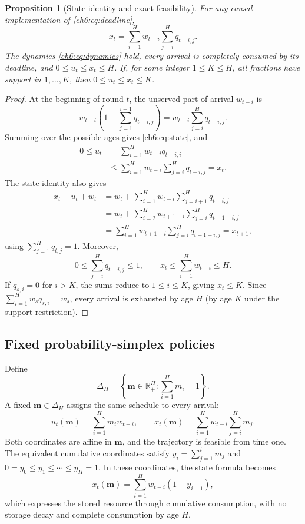 \documentclass[11pt]{article}
\newcommand{\Real}{\mathbb{R}}
\theoremstyle{plain}
\newtheorem{Thm:Proposition}[Thm:Theorem]{Proposition}
\theoremstyle{remark}
\numberwithin{equation}{section}
\begin{document}
\begin{Thm:Proposition}[State identity and exact feasibility]\label{ch6:prop:state}
For any causal implementation of \eqref{ch6:eq:deadline},
\begin{equation}\label{ch6:eq:state}
 x_t=\sum_{i=1}^H w_{t-i}\sum_{j=i}^Hq_{t-i,j}.
\end{equation}
The dynamics \eqref{ch6:eq:dynamics} hold, every arrival is completely consumed
by its deadline, and $0\le u_t\le x_t\le H$. If, for some integer
$1\le K\le H$, all fractions have support in $1,\ldots,K$, then
$0\le u_t\le x_t\le K$.
\end{Thm:Proposition}
\begin{proof}
At the beginning of round $t$, the unserved part of arrival $w_{t-i}$ is
\[
w_{t-i}\left(1-\sum_{j=1}^{i-1}q_{t-i,j}\right)
=w_{t-i}\sum_{j=i}^{H}q_{t-i,j}.
\]
Summing over the possible ages gives \eqref{ch6:eq:state}, and
\begin{align*}
0\le u_t
&=\sum_{i=1}^{H}w_{t-i}q_{t-i,i}\\
&\le\sum_{i=1}^{H}w_{t-i}\sum_{j=i}^{H}q_{t-i,j}
=x_t.
\end{align*}
The state identity also gives
\begin{align*}
x_t-u_t+w_t
&=w_t+\sum_{i=1}^{H}w_{t-i}\sum_{j=i+1}^{H}q_{t-i,j}\\
&=w_t+\sum_{i=2}^{H}w_{t+1-i}\sum_{j=i}^{H}q_{t+1-i,j}\\
&=\sum_{i=1}^{H}w_{t+1-i}\sum_{j=i}^{H}q_{t+1-i,j}
=x_{t+1},
\end{align*}
using $\sum_{j=1}^{H}q_{t,j}=1$.  Moreover,
\[
0\le\sum_{j=i}^{H}q_{t-i,j}\le1,
\qquad
x_t\le\sum_{i=1}^{H}w_{t-i}\le H.
\]
If $q_{s,i}=0$ for $i>K$, the sums reduce to $1\le i\le K$, giving
$x_t\le K$.  Since $\sum_{i=1}^{H}w_sq_{s,i}=w_s$, every arrival is
exhausted by age $H$ (by age $K$ under the support restriction).
\end{proof}

\subsection{Fixed probability-simplex policies}
\label{ch6:subsec:fixed-policies}
Define
\begin{equation}\label{ch6:eq:simplex}
 \Delta_H=\left\{\mathbf m\in\Real_+^H:\sum_{i=1}^Hm_i=1\right\}.
\end{equation}
A fixed $\mathbf m\in\Delta_H$ assigns the same schedule to every arrival:
\begin{equation}\label{ch6:eq:fixed-pair}
 u_t(\mathbf m)=\sum_{i=1}^Hm_iw_{t-i},\qquad
 x_t(\mathbf m)=\sum_{i=1}^Hw_{t-i}\sum_{j=i}^Hm_j.
\end{equation}
Both coordinates are affine in $\mathbf m$, and the trajectory is feasible from
time one. The equivalent cumulative coordinates satisfy
$y_i=\sum_{j=1}^im_j$ and $0=y_0\le y_1\le\cdots\le y_H=1$.
In these coordinates, the state formula becomes
\[
 x_t(\mathbf m)=\sum_{i=1}^Hw_{t-i}(1-y_{i-1}),
\]
which expresses the stored resource through cumulative consumption,
with no storage decay and complete consumption by age $H$.
\end{document}
